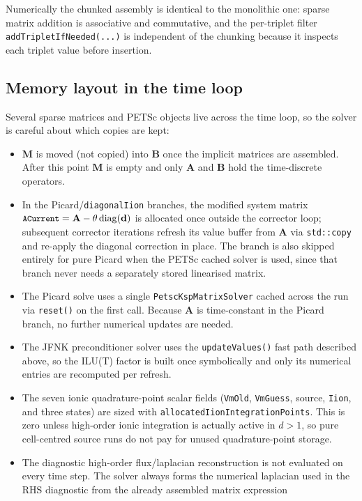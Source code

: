 \documentclass[11pt,a4paper]{article}
\newcommand{\code}[1]{\texttt{\small #1}}
\newcommand{\Mmass}{\mathbf{M}}
\newcommand{\Aimp}{\mathbf{A}}
\newcommand{\Bimp}{\mathbf{B}}
\begin{document}
Numerically the chunked assembly is identical to the monolithic one: sparse
matrix addition is associative and commutative, and the per-triplet filter
\code{addTripletIfNeeded(...)} is independent of the chunking because it
inspects each triplet value before insertion.

\subsection{Memory layout in the time loop}
\label{sec:memory-loop}

Several sparse matrices and PETSc objects live across the time loop, so the
solver is careful about which copies are kept:
\begin{itemize}
\item $\Mmass$ is moved (not copied) into $\Bimp$ once the implicit matrices
are assembled. After this point $\Mmass$ is empty and only $\Aimp$ and $\Bimp$
hold the time-discrete operators.
\item In the Picard/\code{diagonalIion} branches, the modified system matrix
$\code{ACurrent}=\Aimp-\theta\,\mathrm{diag}(\mathbf{d})$ is allocated once
outside the corrector loop; subsequent corrector iterations refresh its value
buffer from $\Aimp$ via \code{std::copy} and re-apply the diagonal correction
in place. The branch is also skipped entirely for pure Picard when the PETSc
cached solver is used, since that branch never needs a separately stored
linearised matrix.
\item The Picard solve uses a single \code{PetscKspMatrixSolver} cached
across the run via \code{reset()} on the first call. Because $\Aimp$ is
time-constant in the Picard branch, no further numerical updates are needed.
\item The JFNK preconditioner solver uses the \code{updateValues()} fast path
described above, so the ILU(T) factor is built once symbolically and only its
numerical entries are recomputed per refresh.
\item The seven ionic quadrature-point scalar fields
(\code{VmOld}, \code{VmGuess}, source, \code{Iion}, and three states) are sized
with \code{allocatedIionIntegrationPoints}. This is zero unless high-order
ionic integration is actually active in $d>1$, so pure cell-centred source
runs do not pay for unused quadrature-point storage.
\item The diagnostic high-order flux/laplacian reconstruction is not evaluated
on every time step. The solver always forms the numerical laplacian used in
the RHS diagnostic from the already assembled matrix expression

\end{itemize}
\end{document}
